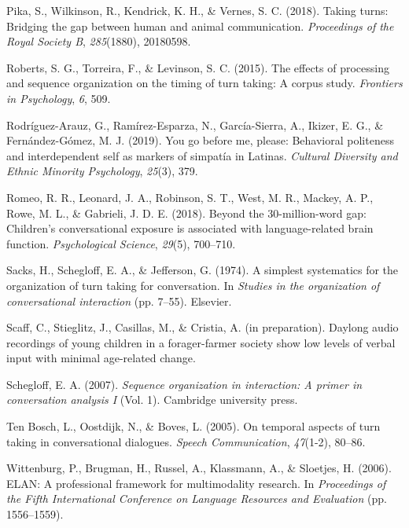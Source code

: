 \documentclass[10pt, letterpaper]{article}
\newenvironment{CSLReferences}%
  {}%
  {\par}
\begin{document}
\begin{CSLReferences}{1}{0}
\leavevmode\hypertarget{ref-pika2018taking}{}%
Pika, S., Wilkinson, R., Kendrick, K. H., \& Vernes, S. C. (2018).
Taking turns: Bridging the gap between human and animal communication.
\emph{Proceedings of the Royal Society B}, \emph{285}(1880), 20180598.

\leavevmode\hypertarget{ref-roberts2015effects}{}%
Roberts, S. G., Torreira, F., \& Levinson, S. C. (2015). The effects of
processing and sequence organization on the timing of turn taking: A
corpus study. \emph{Frontiers in Psychology}, \emph{6}, 509.

\leavevmode\hypertarget{ref-rodriguez2019you}{}%
Rodríguez-Arauz, G., Ramírez-Esparza, N., García-Sierra, A., Ikizer, E.
G., \& Fernández-Gómez, M. J. (2019). You go before me, please:
Behavioral politeness and interdependent self as markers of simpatía in
{L}atinas. \emph{Cultural Diversity and Ethnic Minority Psychology},
\emph{25}(3), 379.

\leavevmode\hypertarget{ref-romeo2018beyond}{}%
Romeo, R. R., Leonard, J. A., Robinson, S. T., West, M. R., Mackey, A.
P., Rowe, M. L., \& Gabrieli, J. D. E. (2018). Beyond the
30-million-word gap: Children's conversational exposure is associated
with language-related brain function. \emph{Psychological Science},
\emph{29}(5), 700--710.

\leavevmode\hypertarget{ref-sacks1974simplest}{}%
Sacks, H., Schegloff, E. A., \& Jefferson, G. (1974). A simplest
systematics for the organization of turn taking for conversation. In
\emph{Studies in the organization of conversational interaction} (pp.
7--55). Elsevier.

\leavevmode\hypertarget{ref-scaffIPlanguage}{}%
Scaff, C., Stieglitz, J., Casillas, M., \& Cristia, A. (in preparation).
Daylong audio recordings of young children in a forager-farmer society
show low levels of verbal input with minimal age-related change.

\leavevmode\hypertarget{ref-schegloff2007sequence}{}%
Schegloff, E. A. (2007). \emph{Sequence organization in interaction: A
primer in conversation analysis {I}} (Vol. 1). Cambridge university
press.

\leavevmode\hypertarget{ref-ten2005temporal}{}%
Ten Bosch, L., Oostdijk, N., \& Boves, L. (2005). On temporal aspects of
turn taking in conversational dialogues. \emph{Speech Communication},
\emph{47}(1-2), 80--86.

\leavevmode\hypertarget{ref-ELAN}{}%
Wittenburg, P., Brugman, H., Russel, A., Klassmann, A., \& Sloetjes, H.
(2006). {ELAN}: A professional framework for multimodality research. In
\emph{{Proceedings of the Fifth International Conference on Language
Resources and Evaluation}} (pp. 1556--1559).

\end{CSLReferences}


\end{document}
